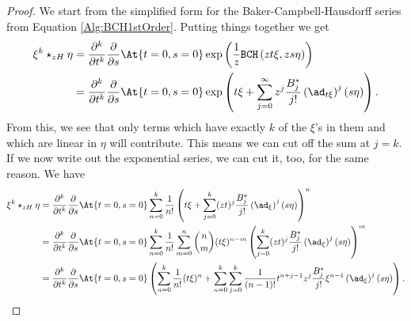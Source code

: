\begin{proof}
    We start from the simplified form for the Baker-Campbell-Hausdorff 
    series from Equation \eqref{Alg:BCH1stOrder}. Putting things 
    together we get
    \begin{align*}
        \xi^k \star_{zH} \eta
        & =
        \frac{\partial^k}{\partial t^k}
        \frac{\partial}{\partial s}
        \At{t=0, s=0}
        \exp \left(
            \frac{1}{z} \bch{z t \xi}{z s \eta}
        \right)
        \\
        & =
        \frac{\partial^k}{\partial t^k}
        \frac{\partial}{\partial s}
        \At{t=0, s=0}
        \exp \left(
            t \xi + \sum\limits_{j=0}^{\infty}
            z^j \frac{B_j^*}{j!}
            \left( \ad_{t \xi} \right)^j
            (s \eta)
        \right).
    \end{align*}
    From this, we see that only terms which have exactly $k$ of the
    $\xi$'s in them and which are linear in $\eta$ will
    contribute. This means we can cut off the sum at $j = k$. If we
    now write out the exponential series, we can cut it, too, for the
    same reason. We have
    \begin{align*}
        \xi^k \star_{zH} \eta
        & =
        \frac{\partial^k}{\partial t^k}
        \frac{\partial}{\partial s}
        \At{t=0, s=0}
        \sum\limits_{n=0}^{k}
        \frac{1}{n!}
        \left(
            t \xi
            +
            \sum\limits_{j=0}^{k}
            (zt)^j \frac{B_j^*}{j!}
            \left(\ad_{\xi}\right)^j
            (s \eta)
        \right)^n
        \\
        & =
        \frac{\partial^k}{\partial t^k}
        \frac{\partial}{\partial s}
        \At{t=0, s=0}
        \sum\limits_{n=0}^{k}
        \frac{1}{n!}
        \sum\limits_{m = 0}^n
        \binom{n}{m}
        (t \xi)^{n - m}
        \left(
            \sum\limits_{j=0}^{k}
            (zt)^j \frac{B_j^*}{j!}
            \left(\ad_{\xi}\right)^j
            (s \eta)
        \right)^m
        \\
        & =
        \frac{\partial^k}{\partial t^k}
        \frac{\partial}{\partial s}
        \At{t=0, s=0}
        \left(
            \sum\limits_{n=0}^{k}
            \frac{1}{n!}
            (t \xi)^n
            +
            \sum\limits_{n=0}^{k}
            \sum\limits_{j=0}^k
            \frac{1}{(n - 1)!} t^{n + j - 1}
            z^j \frac{B_j^*}{j!}
            \xi^{n - 1}
            \left( \ad_{\xi} \right)^j
            (s \eta)
        \right).
    \end{align*}

\end{proof}
